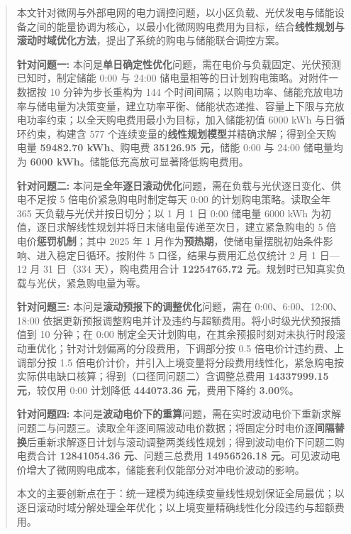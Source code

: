 \begin{abstract}

本文针对微网与外部电网的电力调控问题，以小区负载、光伏发电与储能设备之间的能量协调为核心，以最小化微网购电费用为目标，结合\textbf{线性规划与滚动时域优化方法}，提出了系统的购电与储能联合调控方案。

\textbf{针对问题一:} 本问是\textbf{单日确定性优化}问题，需在电价与负载固定、光伏预测已知时，制定储能 0:00 与 24:00 储电量相等的日计划购电策略。对附件一数据按 10 分钟为步长重构为 144 个时间间隔；以购电功率、储能充放电功率与储电量为决策变量，建立功率平衡、储能状态递推、容量上下限与充放电功率约束；以全天购电费用最小为目标，加入储能初值 6000 kWh 与日循环约束，构建含 577 个连续变量的\textbf{线性规划模型}并精确求解；得到全天购电量 \textbf{59482.70 kWh}、购电费 \textbf{35126.95 元}，储能 0:00 与 24:00 储电量均为 \textbf{6000 kWh}。储能低充高放可显著降低购电费用。

\textbf{针对问题二:} 本问是\textbf{全年逐日滚动优化}问题，需在负载与光伏逐日变化、供电不足按 5 倍电价紧急购电时制定每天 0:00 的计划购电策略。读取全年 365 天负载与光伏并按日切分；以 1 月 1 日 0:00 储电量 6000 kWh 为初值，逐日求解线性规划并将日末储电量传递至次日，建立紧急购电的 5 倍电价\textbf{惩罚机制}；其中 2025 年 1 月作为\textbf{预热期}，使储电量摆脱初始条件影响、进入稳定日循环。按附件 5 口径，结果与费用汇总仅统计 2 月 1 日—12 月 31 日（334 天），购电费用合计 \textbf{12254765.72 元}。规划时已知真实负载与光伏，紧急购电量为零。

\textbf{针对问题三:} 本问是\textbf{滚动预报下的调整优化}问题，需在 0:00、6:00、12:00、18:00 依据更新预报调整购电并计及违约与超额费用。将小时级光伏预报插值到 10 分钟；在 0:00 制定全天计划购电，在其余预报时刻对未执行时段滚动重优化；针对计划偏离的分段费用，下调部分按 0.5 倍电价计违约费、上调部分按 1.5 倍电价计价，并引入上境变量将分段费用线性化，紧急购电按实际供电缺口核算；得到（口径同问题二）含调整总费用 \textbf{14337999.15 元}，较仅用 0:00 计划降低 \textbf{444073.36 元}，费用下降约 \textbf{3.00\%}。

\textbf{针对问题四:} 本问是\textbf{波动电价下的重算}问题，需在实时波动电价下重新求解问题二与问题三。读取全年逐间隔波动电价数据；将固定分时电价逐\textbf{间隔替换}后重新求解逐日计划与滚动调整两类线性规划；得到波动电价下问题二购电费合计 \textbf{12841054.36 元}、问题三总费用 \textbf{14956526.18 元}。可见波动电价增大了微网购电成本，储能套利仅能部分对冲电价波动的影响。

本文的主要创新点在于：统一建模为纯连续变量线性规划保证全局最优；以逐日滚动时域分解处理全年优化；以上境变量精确线性化分段违约与超额费用。


\end{abstract}
